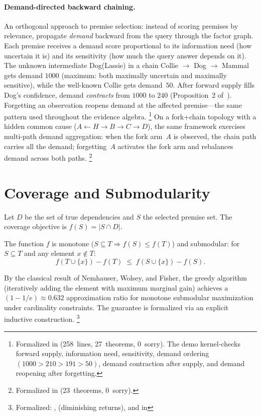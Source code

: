 \documentclass[11pt,openany]{report}
\begin{document}
\paragraph{Demand-directed backward chaining.}
An orthogonal approach to premise selection: instead of scoring
premises by relevance, propagate \emph{demand} backward from the
query through the factor graph.  Each premise receives a demand
score proportional to its information need (how uncertain it is)
and its sensitivity (how much the query answer depends on it).
The unknown intermediate Dog(Lassie) in a chain
Collie $\to$ Dog $\to$ Mammal gets demand $1000$ (maximum: both
maximally uncertain and maximally sensitive), while the well-known
Collie gets demand~$50$.  After forward supply fills Dog's
confidence, demand \emph{contracts} from $1000$ to $240$
(Proposition~2 of~\cite{Goertzel2026BackwardChaining}).
Forgetting an observation reopens demand at the affected
premise---the same  pattern used throughout the
evidence algebra.%
\footnote{Formalized in
(258~lines, 27~theorems, 0~sorry).  The demo kernel-checks
forward supply, information need, sensitivity, demand ordering
$(1000 > 210 > 191 > 50)$, demand contraction after supply, and
demand reopening after forgetting.}
On a fork+chain topology with a hidden common cause
($A \leftarrow H \to B \to C \to D$), the same framework
exercises multi-path demand aggregation: when the fork arm~$A$ is
observed, the chain path carries all the demand; forgetting~$A$
activates the fork arm and rebalances demand across both paths.%
\footnote{Formalized in
(23~theorems, 0~sorry).}


\section{Coverage and Submodularity}
\label{sec:coverage}

Let $D$ be the set of true dependencies and $S$ the selected premise
set.  The coverage objective is $f(S) = |S \cap D|$.

\begin{theorem}
\label{thm:coverage-submod}
The function $f$ is monotone ($S \subseteq T \Rightarrow f(S) \le f(T)$)
and submodular: for $S \subseteq T$ and any element $x \notin T$:
\[
  f(T \cup \{x\}) - f(T) \;\le\; f(S \cup \{x\}) - f(S).
\]
\end{theorem}

\noindent
By the classical result of Nemhauser, Wolsey, and Fisher, the greedy
algorithm (iteratively adding the element with maximum marginal gain)
achieves a $(1 - 1/e) \approx 0.632$ approximation ratio for monotone
submodular maximization under cardinality constraints.  The guarantee
is formalized via an explicit  inductive
construction.%
\footnote{Formalized:
,
 (diminishing returns),
and  in
}
\end{document}
